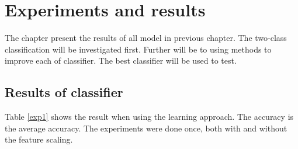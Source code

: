 \documentclass[USenglish]{ifimaster}  %
\begin{document}
\chapter{Experiments and results}                     %
The chapter present the results of all model in previous chapter. The two-class classification will be investigated first. Further will be to using methods to improve each of classifier. The best classifier will be used to test. 

\section{Results of classifier}\label{result_exp1}
Table \ref{exp1} shows the result when using the learning approach. The accuracy is the average accuracy. The experiments were done once, both with and without the feature scaling. 
\end{document}
